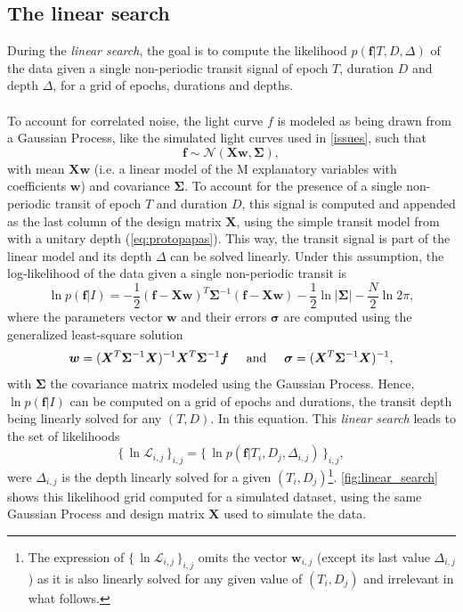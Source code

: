 \documentclass{aastex631}
\newcommand{\set}[1]{\{\,#1\,\}}
\begin{document}
\subsection{The linear search}\label{linear_search}

During the \textit{linear search}, the goal is to compute the likelihood $p(\bm{f} \vert T , D, \Delta)$ of the data given a single non-periodic transit signal of epoch $T$, duration $D$ and depth $\Delta$, for a grid of epochs, durations and depths.
\\\\
To account for correlated noise, the light curve $f$ is modeled as being drawn from a Gaussian Process, like the simulated light curves used in \autoref{issues}, such that
\begin{equation*}
    \bm{f} \sim \mathcal{N}(\bm{X w}, \bm{\Sigma}),
\end{equation*}
with mean $\bm{Xw}$ (i.e. a linear model of the M explanatory variables with coefficients $\bm{w}$) and covariance $\bm{\Sigma}$. To account for the presence of a single non-periodic transit of epoch $T$ and duration $D$, this signal is computed and appended as the last column of the design matrix $\bm{X}$, using the simple transit model from \cite{protopapas} with a unitary depth (\autoref{eq:protopapas}). This way, the transit signal is part of the linear model and its depth $\Delta$ can be solved linearly. Under this assumption, the log-likelihood of the data given a single non-periodic transit is \citep{Rasmussen2005}
\begin{equation} \label{eq:linear_search_ll}
    \ln p(\bm{f} \vert I) = -\frac{1}{2}(\bm{f}-\bm{Xw})^T\bm{\Sigma}^{-1}(\bm{f}-\bm{Xw}) -  \frac{1}{2}\ln\vert\bm{\Sigma}\vert - \frac{N}{2}\ln 2\pi,
\end{equation}
where the parameters vector $\bm{w}$ and their errors $\bm{\sigma}$ are computed using the generalized least-square solution
\begin{equation}\label{eq:ls}
    \bm{w} = (\bm{X}^T\bm{\Sigma}^{-1}\bm{X})^{-1}\bm{X}^T\bm{\Sigma}^{-1}\bm{f} \hspace{0.5cm} \text{and} \hspace{0.5cm} \bm{\sigma} = (\bm{X}^T\bm{\Sigma}^{-1}\bm{X})^{-1},
\end{equation} 
with $\bm{\Sigma}$ the covariance matrix modeled using the Gaussian Process. Hence, $\ln p(\bm{f} \vert I)$ can be computed on a grid of epochs and durations, the transit depth being linearly solved for any $(T, D)$. In this equation. This \textit{linear search} leads to the set of likelihoods
\begin{equation*}
    \set{\ln\mathcal{L}_{i,j}}_{i, j} = \set{\ln p(\bm{f} \vert T_i ,D_j, \Delta_{i,j})}_{i, j},
\end{equation*}
were $\Delta_{i,j}$ is the depth linearly solved for a given $(T_i, D_j)$\footnote{The expression of $\set{\ln\mathcal{L}_{i,j}}_{i, j}$ omits the vector $\bm{w}_{i,j}$ (except its last value $\Delta_{i,j}$) as it is also linearly solved for any given value of $(T_i, D_j)$ and irrelevant in what follows.}. \autoref{fig:linear_search} shows this likelihood grid computed for a simulated dataset, using the same Gaussian Process  and design matrix $\bm{X}$ used to simulate the data.
\end{document}

